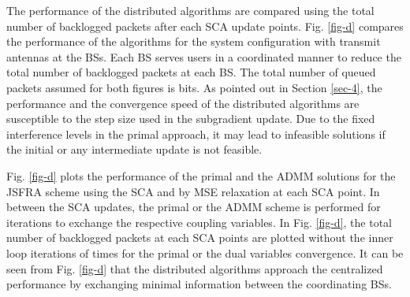 The performance of the distributed algorithms are compared using the total number of backlogged packets after each \ac{SCA} update points. Fig. \ref{fig-d} compares the performance of the algorithms for the system configuration  with  transmit antennas at the \acp{BS}. Each \ac{BS} serves  users in a coordinated manner to reduce the total number of backlogged packets at each \ac{BS}. The total number of queued packets assumed for both figures is  bits. As pointed out in Section \ref{sec-4}, the performance and the convergence speed of the distributed algorithms are susceptible to the step size used in the subgradient update. Due to the fixed interference levels in the primal approach, it may lead to infeasible solutions if the initial or any intermediate update is not feasible.

Fig. \ref{fig-d} plots the performance of the primal and the \ac{ADMM} solutions for the \ac{JSFRA} scheme using the \ac{SCA} and by \ac{MSE} relaxation at each \ac{SCA} point. In between the \ac{SCA} updates, the primal or the \ac{ADMM} scheme is performed for  iterations to exchange the respective coupling variables. In Fig. \ref{fig-d}, the total number of backlogged packets at each \ac{SCA} points are plotted without the inner loop iterations of  times for the primal or the dual variables convergence. It can be seen from Fig. \ref{fig-d} that the distributed algorithms approach the centralized performance by exchanging minimal information between the coordinating \acp{BS}.

